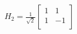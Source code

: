 \documentclass[preview]{standalone}
\begin{document}
\begin{align*}
H_2 = \frac{1}{\sqrt{2}} \left[{\begin{array}{cc} 1 & 1 \\ 1 & -1 \\ \end{array}} \right]
\end{align*}
\end{document}

